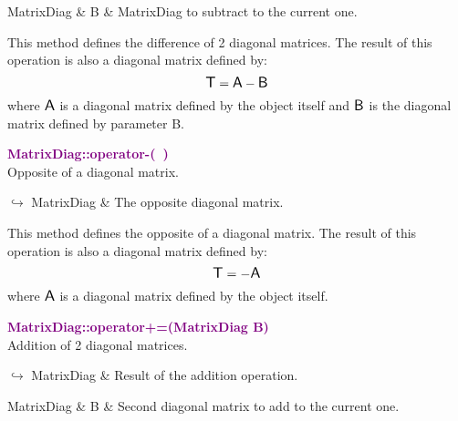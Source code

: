 \begin{tcolorbox}[width=\textwidth,myArgs,tabularx={ll|R}]
MatrixDiag & B & MatrixDiag to subtract to the current one.
\end{tcolorbox}

This method defines the difference of 2 diagonal matrices.
The result of this operation is also a diagonal matrix defined by:
\begin{equation*}
\mbox{\large\ensuremath{\mathsf{T}}} = \mbox{\large\ensuremath{\mathsf{A}}} - \mbox{\large\ensuremath{\mathsf{B}}}
\end{equation*}
where $\mbox{\large\ensuremath{\mathsf{A}}}$ is a diagonal matrix defined by the object itself and $\mbox{\large\ensuremath{\mathsf{B}}}$ is the diagonal matrix defined by parameter B.

\textcolor{purple}{\textbf{MatrixDiag::operator-(~)}}\label{MatrixDiag::operator-()}\\
Opposite of a diagonal matrix.\vspace*{-0.5em}
\begin{tcolorbox}[grow to left by=-1cm, width=\textwidth-1cm,myArgs,tabularx={l|R}]
$\hookrightarrow$ MatrixDiag & The opposite diagonal matrix.
\end{tcolorbox}

This method defines the opposite of a diagonal matrix.
The result of this operation is also a diagonal matrix defined by:
\begin{equation*}
\mbox{\large\ensuremath{\mathsf{T}}} = - \mbox{\large\ensuremath{\mathsf{A}}}
\end{equation*}
where $\mbox{\large\ensuremath{\mathsf{A}}}$ is a diagonal matrix defined by the object itself.

\textcolor{purple}{\textbf{MatrixDiag::operator+=(MatrixDiag B)}}\label{MatrixDiag::operator+=(MatrixDiag B)}\\
Addition of 2 diagonal matrices.\vspace*{-0.5em}
\begin{tcolorbox}[grow to left by=-1cm, width=\textwidth-1cm,myArgs,tabularx={l|R}]
$\hookrightarrow$ MatrixDiag & Result of the addition operation.
\end{tcolorbox}

\begin{tcolorbox}[width=\textwidth,myArgs,tabularx={ll|R}]
MatrixDiag & B & Second diagonal matrix to add to the current one.
\end{tcolorbox}

